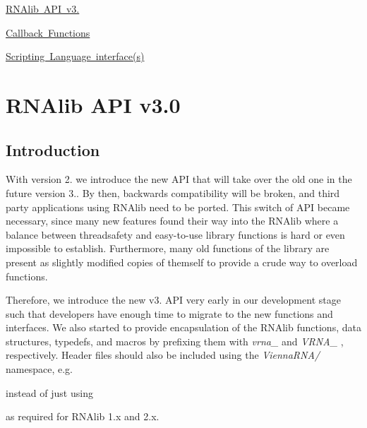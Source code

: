
\begin{DoxyItemize}
\item \mbox{\hyperlink{newAPI}{R\+N\+Alib A\+PI v3.}}
\item \mbox{\hyperlink{callbacks}{Callback Functions}}
\item \mbox{\hyperlink{wrappers}{Scripting Language interface(s)}} 
\end{DoxyItemize}\hypertarget{newAPI}{}\section{R\+N\+Alib A\+PI v3.0}\label{newAPI}
\hypertarget{newAPI_newAPI_intro}{}\subsection{Introduction}\label{newAPI_newAPI_intro}
With version 2. we introduce the new A\+PI that will take over the old one in the future version 3.. By then, backwards compatibility will be broken, and third party applications using R\+N\+Alib need to be ported. This switch of A\+PI became necessary, since many new features found their way into the R\+N\+Alib where a balance between threadsafety and easy-\/to-\/use library functions is hard or even impossible to establish. Furthermore, many old functions of the library are present as slightly modified copies of themself to provide a crude way to overload functions.

Therefore, we introduce the new v3. A\+PI very early in our development stage such that developers have enough time to migrate to the new functions and interfaces. We also started to provide encapsulation of the R\+N\+Alib functions, data structures, typedefs, and macros by prefixing them with {\itshape vrna\+\_\+} and {\itshape V\+R\+N\+A\+\_\+} , respectively. Header files should also be included using the {\itshape Vienna\+R\+N\+A/} namespace, e.\+g. 
\begin{DoxyCode}{0}
\end{DoxyCode}
 instead of just using 
\begin{DoxyCode}{0}
\end{DoxyCode}
 as required for R\+N\+Alib 1.\+x and 2.\+x.

